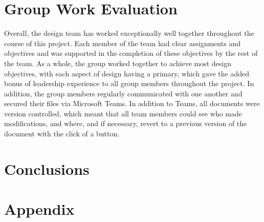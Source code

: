 \documentclass[stu, a4paper, 12pt, floatsintext]{apa7}
\numberwithin{figure}{section}
\numberwithin{table}{section}
\numberwithin{equation}{section}
\begin{document}
\section{Group Work Evaluation}
Overall, the design team has worked exceptionally well together throughout the course of this project. Each member of the team had clear assignments and objectives and was supported in the completion of these objectives by the rest of the team. As a whole, the group worked together to achieve most design objectives, with each aspect of design having a primary, which gave the added bonus of leadership experience to all group members throughout the project. In addition, the group members regularly communicated with one another and secured their files via Microsoft Teams. In addition to Teams, all documents were version controlled, which meant that all team members could see who made modifications, and where, and if necessary, revert to a previous version of the document with the click of a button.  
\section{Conclusions}

\section{Appendix}

\printbibliography
\end{document}

